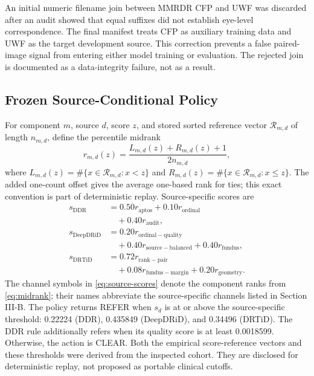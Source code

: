\documentclass{ieeeaccess}
\begin{document}
An initial numeric filename join between MMRDR CFP and UWF was discarded after an audit showed that equal suffixes did not establish eye-level correspondence. The final manifest treats CFP as auxiliary training data and UWF as the target development source. This correction prevents a false paired-image signal from entering either model training or evaluation. The rejected join is documented as a data-integrity failure, not as a result.

\subsection{Frozen Source-Conditional Policy}
For component $m$, source $d$, score $z$, and stored sorted reference vector $\mathcal{R}_{m,d}$ of length $n_{m,d}$, define the percentile midrank
\begin{equation}
 r_{m,d}(z)=\frac{L_{m,d}(z)+R_{m,d}(z)+1}{2n_{m,d}},
\label{eq:midrank}
\end{equation}
where $L_{m,d}(z)=\#\{x\in\mathcal{R}_{m,d}:x<z\}$ and $R_{m,d}(z)=\#\{x\in\mathcal{R}_{m,d}:x\le z\}$. The added one-count offset gives the average one-based rank for ties; this exact convention is part of deterministic replay. Source-specific scores are
\begin{equation}
\begin{aligned}
s_{\mathrm{DDR}} &= 0.50r_{\mathrm{aptos}}+0.10r_{\mathrm{ordinal}}\\
&\quad +0.40r_{\mathrm{audit}},\\
s_{\mathrm{DeepDRiD}} &= 0.20r_{\mathrm{ordinal-quality}}\\
&\quad +0.40r_{\mathrm{source-balanced}}+0.40r_{\mathrm{fundus}},\\
s_{\mathrm{DRTiD}} &= 0.72r_{\mathrm{rank-pair}}\\
&\quad +0.08r_{\mathrm{fundus-margin}}+0.20r_{\mathrm{geometry}}.
\end{aligned}
\label{eq:source-scores}
\end{equation}
The channel symbols in \eqref{eq:source-scores} denote the component ranks from \eqref{eq:midrank}; their names abbreviate the source-specific channels listed in Section III-B. The policy returns REFER when $s_d$ is at or above the source-specific threshold: 0.22224 (DDR), 0.435849 (DeepDRiD), and 0.34496 (DRTiD). The DDR rule additionally refers when its quality score is at least 0.0018599. Otherwise, the action is CLEAR. Both the empirical score-reference vectors and these thresholds were derived from the inspected cohort. They are disclosed for deterministic replay, not proposed as portable clinical cutoffs.
\end{document}
